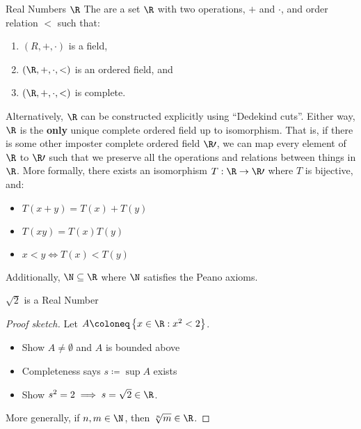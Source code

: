 
\begin{dfnbox}{Real Numbers $\R$}{}
    The  are a set $\R$ with two operations, $+$ and $\cdot$, and order relation $<$ such that:
    \begin{enumerate}[noitemsep]
        \item $(R, +, \cdot)$ is a field,
        \item $(\R, +, \cdot, <)$ is an ordered field, and
        \item $(\R, +, \cdot, <)$ is complete.
    \end{enumerate}
\end{dfnbox}

Alternatively, $\R$ can be constructed explicitly using ``Dedekind cuts''. Either way, $\R$ is the \textbf{only} unique complete ordered field up to isomorphism. That is, if there is some other imposter complete ordered field $\R\prime$, we can map every element of $\R$ to $\R\prime$ such that we preserve all the operations and relations between things in $\R$. More formally, there exists an isomorphism $T : \R \to \R\prime$ where $T$ is bijective, and:
\begin{itemize}[noitemsep]
    \item $T(x+y) = T(x) + T(y)$
    \item $T(xy) = T(x)T(y)$
    \item $x < y \iff T(x) < T(y)$
\end{itemize}

Additionally, $\N \subseteq \R$ where $\N$ satisfies the Peano axioms.

\begin{thmbox}{$\sqrt{2}$ is a Real Number}{}
    \begin{proof}[Proof sketch]
        Let $A \coloneq \left\{ x \in \R : x^2 < 2 \right\}$.
        \begin{itemize}[noitemsep]
            \item Show $A \neq \emptyset$ and $A$ is bounded above
            \item Completeness says $s \coloneq \sup A$ exists
            \item Show $s^2 = 2 \implies s = \sqrt{2} \in \R$.
        \end{itemize}
        More generally, if $n,m \in \N$, then $\sqrt[n]{m} \in \R$.
    \end{proof}
\end{thmbox}
